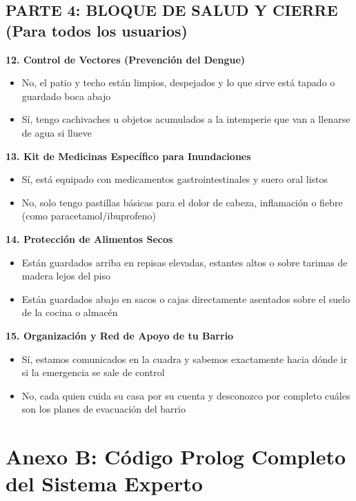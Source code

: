 \documentclass[12pt, letterpaper]{article}
\begin{document}
\subsection*{PARTE 4: BLOQUE DE SALUD Y CIERRE (Para todos los usuarios)}

\textbf{12. Control de Vectores (Prevención del Dengue)}
\begin{itemize}[label={}]
  \item [A] No, el patio y techo están limpios, despejados y lo que sirve está tapado o guardado boca abajo
  \item [B] Sí, tengo cachivaches u objetos acumulados a la intemperie que van a llenarse de agua si llueve
\end{itemize}

\textbf{13. Kit de Medicinas Específico para Inundaciones}
\begin{itemize}[label={}]
  \item [A] Sí, está equipado con medicamentos gastrointestinales y suero oral listos
  \item [B] No, solo tengo pastillas básicas para el dolor de cabeza, inflamación o fiebre (como paracetamol/ibuprofeno)
\end{itemize}

\textbf{14. Protección de Alimentos Secos}
\begin{itemize}[label={}]
  \item [A] Están guardados arriba en repisas elevadas, estantes altos o sobre tarimas de madera lejos del piso
  \item [B] Están guardados abajo en sacos o cajas directamente asentados sobre el suelo de la cocina o almacén
\end{itemize}

\textbf{15. Organización y Red de Apoyo de tu Barrio}
\begin{itemize}[label={}]
  \item [A] Sí, estamos comunicados en la cuadra y sabemos exactamente hacia dónde ir si la emergencia se sale de control
  \item [B] No, cada quien cuida su casa por su cuenta y desconozco por completo cuáles son los planes de evacuación del barrio
\end{itemize}

\newpage
\section{Anexo B: Código Prolog Completo del Sistema Experto}
\end{document}
